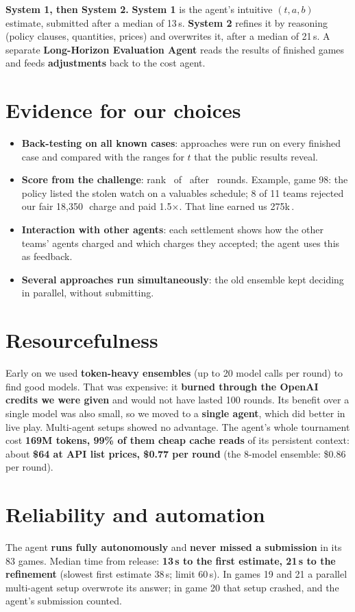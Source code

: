 \documentclass[10pt]{article}
\newcommand{\euro}{\,\texteuro}
\begin{document}
\textbf{System 1, then System 2.} \textbf{System 1} is the agent's intuitive $(t,a,b)$ estimate, submitted after a median
of 13\,s. \textbf{System 2} refines it by reasoning (policy clauses, quantities, prices) and overwrites it, after a median
of 21\,s. A separate \textbf{Long-Horizon Evaluation Agent} reads the results of finished games and feeds
\textbf{adjustments} back to the cost agent.

\section{Evidence for our choices}
\begin{itemize}
  \item \textbf{Back-testing on all known cases}: approaches were run on every finished case and compared with the
        ranges for $t$ that the public results reveal. %
  \item \textbf{Score from the challenge}: rank \Rank\ of \NTeams\ after \NGames\ rounds. Example, game 98: the policy listed the stolen watch on a valuables
        schedule; 8 of 11 teams rejected our fair 18,350\euro\ charge and paid 1.5$\times$. That line earned us 275k\euro.
  \item \textbf{Interaction with other agents}: each settlement shows how the other teams' agents charged and which
        charges they accepted; the agent uses this as feedback. %
  \item \textbf{Several approaches run simultaneously}: the old ensemble kept deciding in parallel, without submitting.
\end{itemize}

\section{Resourcefulness}
Early on we used \textbf{token-heavy ensembles} (up to 20 model calls per round) to find good models. That was
expensive: it \textbf{burned through the OpenAI credits we were given} and would not have lasted 100 rounds. Its
benefit over a single model was also small, so we moved to a \textbf{single agent}, which did better in live play.
Multi-agent setups showed no advantage. The agent's whole tournament cost \textbf{169M tokens, 99\% of them cheap cache reads} of its persistent
context: about \textbf{\$64 at API list prices, \$0.77 per round} (the 8-model ensemble: \$0.86 per round).

\section{Reliability and automation}
The agent \textbf{runs fully autonomously} and \textbf{never missed a submission} in its 83 games. Median time from
release: \textbf{13\,s to the first estimate, 21\,s to the refinement} (slowest first estimate 38\,s; limit 60\,s). In games 19 and 21 a parallel multi-agent setup overwrote its answer; in game 20 that
setup crashed, and the agent's submission counted.
\end{document}
